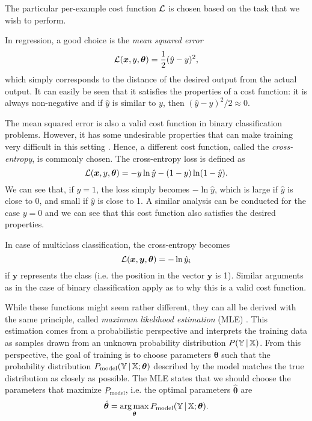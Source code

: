 The particular per-example cost function $\operatorname{\mathcal{L}}$ is chosen based on the task that we wish to perform.

In regression, a good choice is the \emph{mean squared error}
\begin{equation}
\operatorname{\mathcal{L}}(\bm{x}, y, \bm{\theta}) = \frac1{2}(\hat{y}-y)^2,
\end{equation}
which simply corresponds to the distance of the desired output from the actual output. It can easily be seen that it satisfies the properties of a cost function: it is always non-negative and if $\hat{y}$ is similar to $y$, then $(\hat{y}-y)^2/2 \approx 0$.

The mean squared error is also a valid cost function in  binary classification problems. However, it has some undesirable properties that can make training very difficult in this setting \cite[Ch.\,6,\,p.\,178]{DBLP:books/daglib/0040158}. Hence, a different cost function, called the \emph{cross-entropy}, is commonly chosen. The cross-entropy loss is defined as
\begin{equation}
\operatorname{\mathcal{L}}(\bm{x}, y, \bm{\theta}) = -y \ln \hat{y} - (1-y)\ln(1-\hat{y}).
\end{equation}
We can see that, if $y=1$, the loss simply becomes $-\ln\hat{y}$, which is large if $\hat{y}$ is close to 0, and small if $\hat{y}$ is close to 1. A similar analysis can be conducted for the case $y=0$ and we can see that this cost function also satisfies the desired properties.

In case of multiclass classification, the cross-entropy becomes
\begin{equation}
\operatorname{\mathcal{L}}(\bm{x}, \bm{y}, \bm{\theta}) = -\ln \hat{y}_i
\end{equation}
if $\bm{y}$ represents the  class (i.e. the  position in the vector $\bm{y}$ is 1). Similar arguments as in the case of binary classification apply as to why this is a valid cost function.

While these functions might seem rather different, they can all be derived with the same principle, called \emph{maximum likelihood estimation} (MLE) \cite[Ch.\,5,\,pp.\,128-131]{DBLP:books/daglib/0040158}. This estimation comes from a probabilistic perspective and interprets the training data as samples drawn from an unknown probability distribution $P(\mathbb{Y}\,|\,\mathbb{X})$. From this perspective, the goal of training is to choose parameters $\bm{\theta}$ such that the probability distribution $P_{\text{model}}(\mathbb{Y}\,|\,\mathbb{X}; \bm{\theta})$ described by the model matches the true distribution as closely as possible. The MLE states that we should choose the parameters that maximize $P_{\text{model}}$, i.e. the optimal parameters $\hat{\bm{\theta}}$ are
\begin{equation}
\hat{\bm{\theta}} = \operatorname*{arg\,max}_{\bm{\theta}} P_{\text{model}}(\mathbb{Y}\,|\,\mathbb{X}; \bm{\theta}).
\end{equation}

